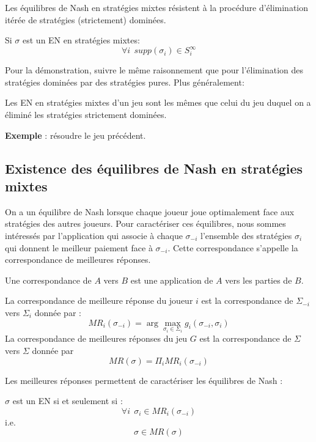 Les équilibres de Nash en stratégies mixtes résistent à la
procédure d'élimination itérée de stratégies (strictement)
dominées.

\begin{proposition}
Si $\sigma$ est un EN en stratégies mixtes:
$$
\forall i\ \  supp(\sigma_i) \in S_i^\infty
$$
\end{proposition}
Pour la démonstration, suivre le même raisonnement que pour
l'élimination des stratégies dominées par des stratégies pures.
Plus généralement:
\begin{proposition}
Les EN en stratégies mixtes d'un jeu sont les mêmes que celui du
jeu duquel on a éliminé les stratégies strictement
dominées.
\end{proposition}

{\bf Exemple} : r\'esoudre le jeu pr\'ec\'edent.

\subsection{Existence des équilibres de Nash en stratégies mixtes}
On a un équilibre de Nash lorsque chaque joueur joue optimalement
face aux stratégies des autres joueurs.  Pour caractériser ces
équilibres, nous sommes intéressés par l'application qui associe à
chaque $\sigma_{-i}$ l'ensemble des stratégies $\sigma_i$ qui
donnent le meilleur paiement face à $\sigma_{-i}$. Cette
correspondance s'appelle la correspondance de meilleures réponses.

\begin{definition}
Une correspondance de $A$ vers $B$ est une application de $A$ vers
les parties de $B$.%
\end{definition}

\begin{definition}
 La correspondance de meilleure r\'eponse du joueur $i$ est la correspondance de
$\Sigma_{-i}$ vers $\Sigma_i$ donnée par :
$$
MR_i(\sigma_{-i})=\arg\max_{\sigma_i\in
\Sigma_i}g_i(\sigma_{-i},\sigma_i)
$$
La correspondance de meilleures réponses du jeu $G$ est la
correspondance de $\Sigma$ vers $\Sigma$ donnée par
$$
MR(\sigma) = \Pi_i MR_i(\sigma_{-i})
$$
\end{definition}
Les meilleures réponses permettent de caractériser les équilibres
de Nash :

\begin{proposition}
$\sigma$ est un EN si et seulement si :
$$
\forall i\ \  \sigma_i \in MR_i(\sigma_{-i})
$$
i.e.
$$
\sigma \in MR(\sigma)
$$
\end{proposition}

